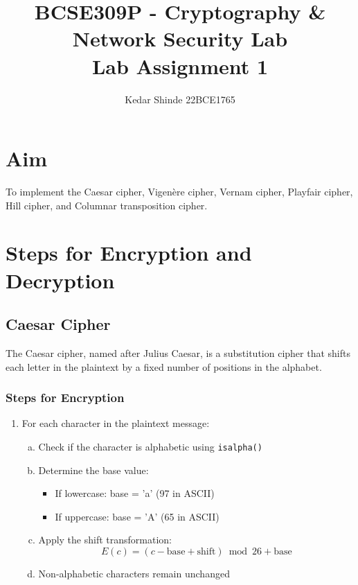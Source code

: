 \documentclass[titlepage]{article}
\title{BCSE309P - Cryptography \& Network Security Lab \\ 
\textbf{Lab Assignment 1}}
\author{Kedar Shinde 22BCE1765}
\date{}
\begin{document}
\pagestyle{fancy}
\fancyhead{} %
\fancyfoot{} %
\fancyfoot[LE,RO]{\thepage}
\maketitle

\section{Aim}
To implement the Caesar cipher, Vigenère cipher, Vernam cipher, Playfair cipher, Hill cipher, and Columnar transposition cipher.

\section{Steps for Encryption and Decryption}
\subsection{Caesar Cipher}
The Caesar cipher, named after Julius Caesar, is a substitution cipher that shifts each letter in the plaintext by a fixed number of positions in the alphabet.

\subsubsection{ Steps for Encryption}
\begin{enumerate}[1.]
\item For each character in the plaintext message:
   \begin{enumerate}[a)]
   \item Check if the character is alphabetic using \texttt{isalpha()}
   \item Determine the base value:
      \begin{itemize}
      \item If lowercase: base = 'a' (97 in ASCII)
      \item If uppercase: base = 'A' (65 in ASCII)
      \end{itemize}
   \item Apply the shift transformation:
      \begin{equation}
      E(c) = (c - \text{base} + \text{shift}) \bmod 26 + \text{base}
      \end{equation}
   \item Non-alphabetic characters remain unchanged
   \end{enumerate}
\end{enumerate}
\end{document}
